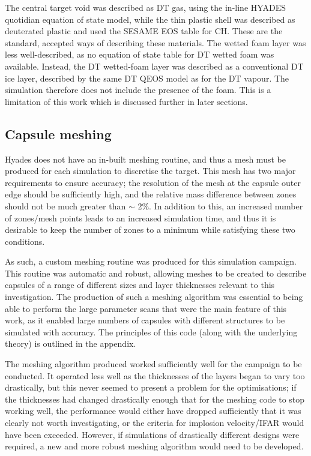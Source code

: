 The central target void was described as DT gas, using the in-line HYADES quotidian equation of state model, while the thin plastic shell was described as deuterated plastic and used the SESAME EOS table for CH. These are the standard, accepted ways of describing these materials. The wetted foam layer was less well-described, as no equation of state table for DT wetted foam was available. Instead, the DT wetted-foam layer was described as a conventional DT ice layer, described by the same DT QEOS model as for the DT vapour. The simulation therefore does not include the presence of the foam. This is a limitation of this work which is discussed further in later sections.

\subsection{Capsule meshing}

Hyades does not have an in-built meshing routine, and thus a mesh must be produced for each simulation to discretise the target. This mesh has two major requirements to ensure accuracy; the resolution of the mesh at the capsule outer edge should be sufficiently high, and the relative mass difference between zones should not be much greater than $\sim$ 2\%. In addition to this, an increased number of zones/mesh points leads to an increased simulation time, and thus it is desirable to keep the number of zones to a minimum while satisfying these two conditions.

As such, a custom meshing routine was produced for this simulation campaign. This routine was automatic and robust, allowing meshes to be created to describe capsules of a range of different sizes and layer thicknesses relevant to this investigation. The production of such a meshing algorithm was essential to being able to perform the large parameter scans that were the main feature of this work, as it enabled large numbers of capsules with different structures to be simulated with accuracy. The principles of this code (along with the underlying theory) is outlined in the appendix.

The meshing algorithm produced worked sufficiently well for the campaign to be conducted. It operated less well as the thicknesses of the layers began to vary too drastically, but this never seemed to present a problem for the optimisations; if the thicknesses had changed drastically enough that for the meshing code to stop working well, the performance would either have dropped sufficiently that it was clearly not worth investigating, or the criteria for implosion velocity/IFAR would have been exceeded. However, if simulations of drastically different designs were required, a new and more robust meshing algorithm would need to be developed.

